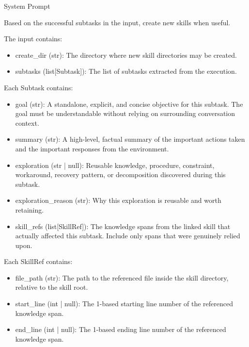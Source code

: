 \documentclass{llmxive}
\providecommand{\svpromptheading}[1]{\par\smallskip\noindent{\sffamily\bfseries#1}\par}
\providecommand{\svinlinecode}[1]{{\ttfamily #1}}
\begin{document}
\begin{svpromptbox}{System Prompt}

\svpromptheading{TODO}
\smallskip
Based on the successful subtasks in the input, create new skills when useful.\par
\smallskip
\svpromptheading{Input}
\smallskip
The input contains:\par
\smallskip
\begin{itemize}
\item \svinlinecode{create\_dir} (\svinlinecode{str}): The directory where new skill directories may be created.
\item \svinlinecode{subtasks} (\svinlinecode{list[Subtask]}): The list of subtasks extracted from the execution.
\end{itemize}
\smallskip
Each \svinlinecode{Subtask} contains:\par
\smallskip
\begin{itemize}
\item \svinlinecode{goal} (\svinlinecode{str}): A standalone, explicit, and concise objective for this subtask. The goal must be understandable without relying on surrounding conversation context.
\item \svinlinecode{summary} (\svinlinecode{str}): A high-level, factual summary of the important actions taken and the important responses from the environment.
\item \svinlinecode{exploration} (\svinlinecode{str | null}): Reusable knowledge, procedure, constraint, workaround, recovery pattern, or decomposition discovered during this subtask.
\item \svinlinecode{exploration\_reason} (\svinlinecode{str}): Why this exploration is reusable and worth retaining.
\item \svinlinecode{skill\_refs} (\svinlinecode{list[SkillRef]}): The knowledge spans from the linked skill that actually affected this subtask. Include only spans that were genuinely relied upon.
\end{itemize}
\smallskip
Each \svinlinecode{SkillRef} contains:\par
\smallskip
\begin{itemize}
\item \svinlinecode{file\_path} (\svinlinecode{str}): The path to the referenced file inside the skill directory, relative to the skill root.
\item \svinlinecode{start\_line} (\svinlinecode{int | null}): The 1-based starting line number of the referenced knowledge span.
\item \svinlinecode{end\_line} (\svinlinecode{int | null}): The 1-based ending line number of the referenced knowledge span.

\end{itemize}
\end{svpromptbox}
\end{document}
